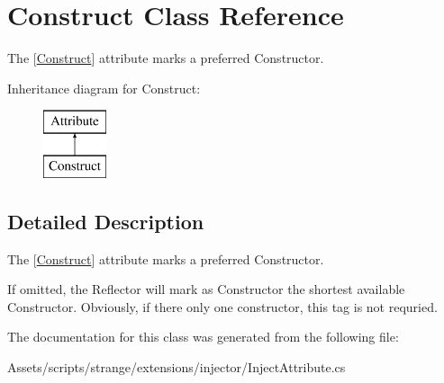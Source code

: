 \hypertarget{class_construct}{\section{Construct Class Reference}
\label{class_construct}
}


The {\ttfamily \mbox{[}\hyperlink{class_construct}{Construct}\mbox{]}} attribute marks a preferred Constructor.  


Inheritance diagram for Construct\-:\begin{figure}[H]
\begin{center}
\leavevmode
\includegraphics[height=2.000000cm]{class_construct}
\end{center}
\end{figure}


\subsection{Detailed Description}
The {\ttfamily \mbox{[}\hyperlink{class_construct}{Construct}\mbox{]}} attribute marks a preferred Constructor. 

If omitted, the Reflector will mark as Constructor the shortest available Constructor. Obviously, if there only one constructor, this tag is not requried. 

The documentation for this class was generated from the following file\-:\begin{DoxyCompactItemize}
\item 
Assets/scripts/strange/extensions/injector/Inject\-Attribute.\-cs\end{DoxyCompactItemize}
